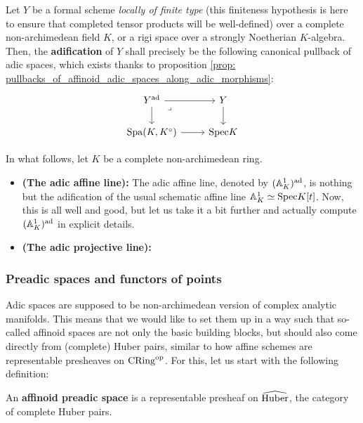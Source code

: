             \begin{definition}[Adification] \label{def: adification}
                Let $Y$ be a formal scheme \textit{locally of finite type} (this finiteness hypothesis is here to ensure that completed tensor products will be well-defined) over a complete non-archimedean field $K$, or a rigi space over a strongly Noetherian $K$-algebra. Then, the \textbf{adification} of $Y$ shall precisely be the following canonical pullback of adic spaces, which exists thanks to proposition \ref{prop: pullbacks_of_affinoid_adic_spaces_along_adic_morphisms}:
                    $$
                        \begin{tikzcd}
                        	{Y^{\ad}} & Y \\
                        	{\Spa(K, K^{\circ})} & {\Spec K}
                        	\arrow[from=2-1, to=2-2]
                        	\arrow[from=1-1, to=2-1]
                        	\arrow[from=1-1, to=1-2]
                        	\arrow["\lrcorner"{anchor=center, pos=0.125}, draw=none, from=1-1, to=2-2]
                        	\arrow[from=1-2, to=2-2]
                        \end{tikzcd}
                    $$
            \end{definition}
            \begin{example} \label{example: adification}
                In what follows, let $K$ be a complete non-archimedean ring.
                \begin{itemize}
                    \item \textbf{(The adic affine line):} The adic affine line, denoted by $(\mathbb{A}^1_K)^{\mathrm{ad}}$, is nothing but the adification of the usual schematic affine line $\mathbb{A}^1_K \simeq \mathrm{Spec} K[t]$. Now, this is all well and good, but let us take it a bit further and actually compute $(\mathbb{A}^1_K)^{\mathrm{ad}}$ in explicit details. 
                    \item \textbf{(The adic projective line):}
                \end{itemize}
            \end{example}
            
        \subsubsection{Preadic spaces and functors of points}
            Adic spaces are supposed to be non-archimedean version of complex analytic manifolds. This means that we would like to set them up in a way such that so-called affinoid spaces are not only the basic building blocks, but should also come directly from (complete) Huber pairs, similar to how affine schemes are representable presheaves on $\mathrm{CRing}^{\mathrm{op}}$. For this, let us start with the following definition:
            \begin{definition} \label{def: pre_adic_spaces}
                An \textbf{affinoid preadic space} is a representable presheaf on $\widehat{\mathrm{Huber}}$, the category of complete Huber pairs. 
            \end{definition}
            
